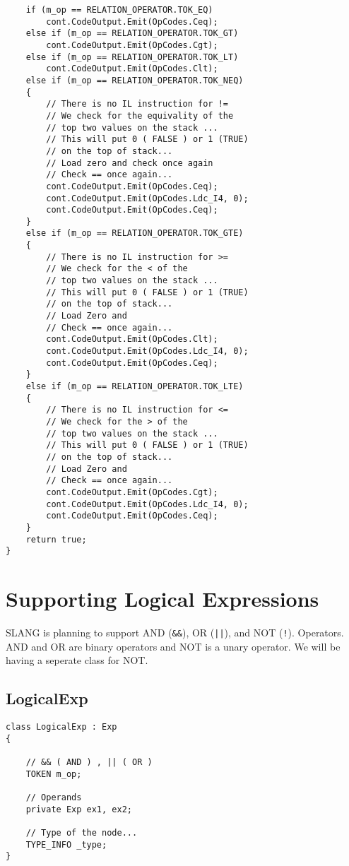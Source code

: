 \begin{lstlisting}
	if (m_op == RELATION_OPERATOR.TOK_EQ)
		cont.CodeOutput.Emit(OpCodes.Ceq);
	else if (m_op == RELATION_OPERATOR.TOK_GT)
		cont.CodeOutput.Emit(OpCodes.Cgt);
	else if (m_op == RELATION_OPERATOR.TOK_LT)
		cont.CodeOutput.Emit(OpCodes.Clt);
	else if (m_op == RELATION_OPERATOR.TOK_NEQ)
	{
		// There is no IL instruction for !=
		// We check for the equivality of the
		// top two values on the stack ...
		// This will put 0 ( FALSE ) or 1 (TRUE)
		// on the top of stack...
		// Load zero and check once again
		// Check == once again...
		cont.CodeOutput.Emit(OpCodes.Ceq);
		cont.CodeOutput.Emit(OpCodes.Ldc_I4, 0);
		cont.CodeOutput.Emit(OpCodes.Ceq);
	}
	else if (m_op == RELATION_OPERATOR.TOK_GTE)
	{
		// There is no IL instruction for >=
		// We check for the < of the
		// top two values on the stack ...
		// This will put 0 ( FALSE ) or 1 (TRUE)
		// on the top of stack...
		// Load Zero and
		// Check == once again...
		cont.CodeOutput.Emit(OpCodes.Clt);
		cont.CodeOutput.Emit(OpCodes.Ldc_I4, 0);
		cont.CodeOutput.Emit(OpCodes.Ceq);
	}
	else if (m_op == RELATION_OPERATOR.TOK_LTE)
	{
		// There is no IL instruction for <=
		// We check for the > of the
		// top two values on the stack ...
		// This will put 0 ( FALSE ) or 1 (TRUE)
		// on the top of stack...
		// Load Zero and
		// Check == once again...
		cont.CodeOutput.Emit(OpCodes.Cgt);
		cont.CodeOutput.Emit(OpCodes.Ldc_I4, 0);
		cont.CodeOutput.Emit(OpCodes.Ceq);
	}
	return true;
}
\end{lstlisting}
\section{Supporting Logical Expressions}
SLANG is planning to support AND (\texttt{\&\&}), OR (\texttt{||}), and NOT (\texttt{!}). Operators. AND and OR are binary operators and NOT is a unary operator. We will be having a seperate class for NOT.
\subsection{LogicalExp}
\lstset{style=csharp}
\begin{lstlisting}
class LogicalExp : Exp
{

	// && ( AND ) , || ( OR )
	TOKEN m_op;

	// Operands
	private Exp ex1, ex2;

	// Type of the node...
	TYPE_INFO _type;
}
\end{lstlisting}
